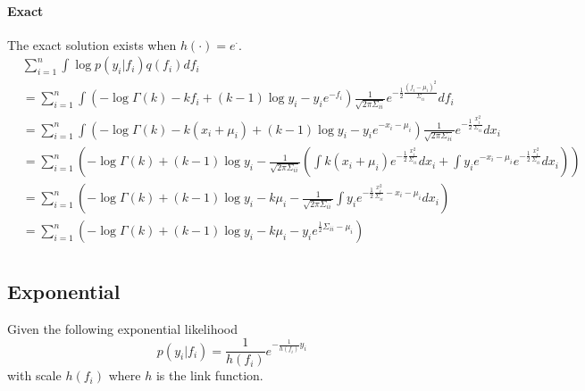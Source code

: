 \documentclass[5p,11pt]{article}
\begin{document}
\paragraph{Exact} The exact solution exists when $h(\cdot) = e^\cdot$.
\begin{equation}
    \begin{aligned}
    &\sum_{i=1}^n \int \log p(y_i|f_i) q(f_i) df_i\\
    &= \sum_{i=1}^n \int \left( -\log \Gamma(k) - k f_i + (k-1)\log y_i - y_i e^{-f_i} \right) \frac{1}{\sqrt{2\pi\Sigma_{ii}}} e^{-\frac{1}{2}\frac{(f_i-\mu_i)^2}{\Sigma_{ii}}} df_i\\
    &= \sum_{i=1}^n \int \left( -\log \Gamma(k) - k (x_i + \mu_i) + (k-1)\log y_i - y_i e^{-x_i - \mu_i} \right) \frac{1}{\sqrt{2\pi\Sigma_{ii}}} e^{-\frac{1}{2}\frac{x_i^2}{\Sigma_{ii}}} dx_i\\
    &= \sum_{i=1}^n \left( -\log \Gamma(k) + (k-1)\log y_i - \frac{1}{\sqrt{2\pi\Sigma_{ii}}} \left( \int k (x_i + \mu_i) e^{-\frac{1}{2}\frac{x_i^2}{\Sigma_{ii}}} dx_i + \int y_i e^{-x_i - \mu_i} e^{-\frac{1}{2}\frac{x_i^2}{\Sigma_{ii}}} dx_i \right) \right)\\
    &= \sum_{i=1}^n \left( -\log \Gamma(k) + (k-1)\log y_i - k \mu_i - \frac{1}{\sqrt{2\pi\Sigma_{ii}}} \int y_i e^{-\frac{1}{2}\frac{x_i^2}{\Sigma_{ii}} - x_i - \mu_i} dx_i \right)\\
    &= \sum_{i=1}^n \left( -\log \Gamma(k) + (k-1)\log y_i - k \mu_i - y_i e^{\frac{1}{2}\Sigma_{ii} - \mu_i} \right)\\
    \end{aligned}
\end{equation}

\subsection{Exponential}
Given the following exponential likelihood
$$ p(y_i|f_i) = \frac{1}{h(f_i)}e^{-\frac{1}{h(f_i)}y_i} $$
with scale $h(f_i)$ where $h$ is the link function.
\end{document}
